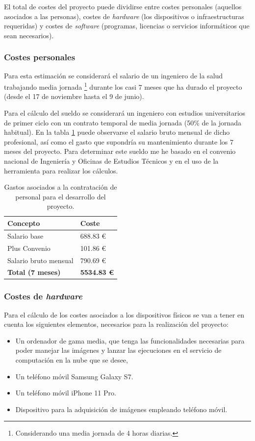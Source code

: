 El total de costes del proyecto puede dividirse entre costes personales (aquellos asociados a las personas), costes de \textit{hardware} (los dispositivos o infraestructuras requeridas) y costes de \textit{software} (programas, licencias o servicios informáticos que sean necesarios).

\subsubsection{Costes personales}

Para esta estimación se considerará el salario de un ingeniero de la salud trabajando media jornada \footnote{Considerando una media jornada de 4 horas diarias.} durante los casi 7 meses que ha durado el proyecto (desde el 17 de noviembre hasta el 9 de junio). 

Para el cálculo del sueldo se considerará un ingeniero con estudios universitarios de primer ciclo con un contrato temporal de media jornada (50\% de la jornada habitual). En la tabla \ref{tab:cost_persona} puede observarse el salario bruto mensual de dicho profesional, así como el gasto que supondría su mantenimiento durante los 7 meses del proyecto. Para determinar este sueldo me he basado en el convenio nacional de Ingeniería y Oficinas de Estudios Técnicos y en el uso de la herramienta \cite{plan:nomina} para realizar los cálculos.

\begin{table}[]
\centering
\begin{tabular}{@{}ll@{}}
\toprule
\rowcolor[HTML]{C0C0C0} 
Concepto              & Coste     \\ \midrule
Salario base          & 688.83 €  \\
Plus Convenio         & 101.86 €  \\
Salario bruto mensual & 790.69 €  \\ \midrule
\textbf{Total (7 meses)}       &  \textbf{
5534.83 €} \\ \bottomrule
\end{tabular}
\caption{Gastos asociados a la contratación de personal para el desarrollo del proyecto.}
\label{tab:cost_persona}
\end{table}

\subsubsection{Costes de \textit{hardware}}

Para el cálculo de los costes asociados a los dispositivos físicos se van a tener en cuenta los siguientes elementos, necesarios para la realización del proyecto: 
\begin{itemize}
    \item Un ordenador de gama media, que tenga las funcionalidades necesarias para poder manejar las imágenes y lanzar las ejecuciones en el servicio de computación en la nube que se desee,
    \item Un teléfono móvil Samsung Galaxy S7.
    \item Un teléfono móvil iPhone 11 Pro.
    \item Dispositivo para la adquisición de imágenes empleando teléfono móvil.
\end{itemize}

